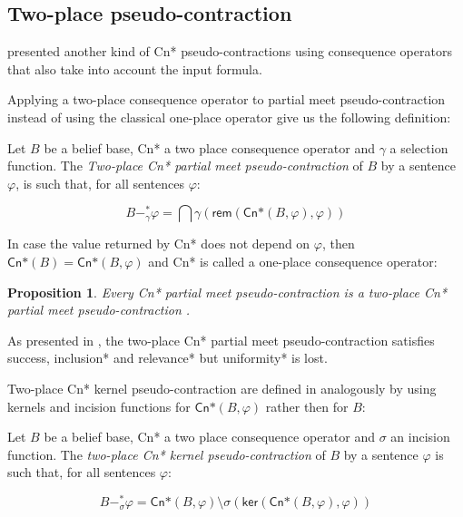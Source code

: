 \subsection{Two-place pseudo-contraction}
\label{subsec:two-place-pseudo-contraction}

\citeauthor{Matos2021} presented another kind of \textsf{Cn*} pseudo-contractions using consequence operators that also take into account the input formula. 

Applying a two-place consequence operator to partial meet pseudo-contraction instead of using the classical one-place operator give us the following definition:

\begin{definition}
    Let $B$ be a belief base, \textsf{Cn*} a two place consequence operator and $\gamma$ a selection function. The \textit{Two-place \textsf{Cn*} partial meet pseudo-contraction} of $B$ by a sentence $\varphi$, is such that, for all sentences $\varphi$:

    $$B -^{*}_{\gamma} \varphi = \bigcap \gamma(\textsf{rem}(\textsf{Cn*}(B, \varphi), \varphi))$$
\end{definition}

In case the value returned by \textsf{Cn*} does not depend on $\varphi$, then $\textsf{Cn*}(B) = \textsf{Cn*}(B, \varphi)$ and \textsf{Cn*} is called a one-place consequence operator:

\newtheorem{proposition}{Proposition}[chapter]

\begin{proposition}
    Every \textsf{Cn*} partial meet pseudo-contraction is a two-place \textsf{Cn*} partial meet pseudo-contraction \citep{Santos2018}.
\end{proposition}

As presented in \citet{Santos2018}, the two-place \textsf{Cn*} partial meet pseudo-contraction satisfies success, inclusion* and relevance* but uniformity* is lost.

Two-place \textsf{Cn*} kernel pseudo-contraction are defined in \citet{Matos2021} analogously by using kernels and incision functions for $\textsf{Cn*}(B, \varphi)$ rather then for $B$:

\begin{definition}
    Let $B$ be a belief base, \textsf{Cn*} a two place consequence operator and $\sigma$ an incision function. The \textit{two-place \textsf{Cn*} kernel pseudo-contraction} of $B$ by a sentence $\varphi$ is such that, for all sentences $\varphi$:

    $$B -^{*}_{\sigma} \varphi = \textsf{Cn*}(B, \varphi) \setminus \sigma(\textsf{ker}(\textsf{Cn*}(B, \varphi), \varphi))$$
\end{definition}


